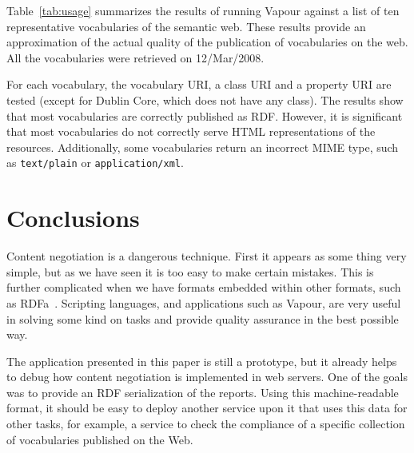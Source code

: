 \documentclass{../templates/llncs}
\begin{document}
Table~\ref{tab:usage} summarizes the results of running Vapour against a list of
ten representative vocabularies of the semantic web. These results provide an
approximation of the
actual quality of the publication of vocabularies on the web. All the vocabularies
were retrieved on 12/Mar/2008.

For each vocabulary, the vocabulary URI, a class URI and a property URI are tested
(except for Dublin Core, which does not have any class). The results show that
most vocabularies are correctly published as RDF. However, it is significant that
most vocabularies do not correctly serve HTML representations of the resources.
Additionally, some vocabularies return an incorrect MIME type,
such as \texttt{text/plain} or \texttt{application/xml}.

\section{\label{sec:conclusions}Conclusions}

Content negotiation is a dangerous technique. First it appears as some thing very 
simple, but as we have seen it is too easy to make certain mistakes. This is 
further complicated when we have formats embedded within other formats,
such as RDFa~\cite{Birbeck2006}. Scripting languages, and applications such as 
Vapour, are very useful in solving some kind on tasks and provide quality 
assurance in the best possible way.


The application presented in this paper is still a prototype, but  
it already helps to debug how content negotiation is implemented in web servers. One of the 
goals was to provide an RDF serialization of the reports. Using this machine-readable 
format, it should be easy to deploy another service upon it that uses this data for 
other tasks, for example, a service to check the compliance of a specific collection 
of vocabularies published on the Web.




\end{document}
